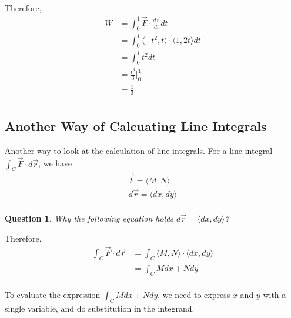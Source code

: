 \documentclass{article}
\newtheorem*{question}{Question}
\begin{document}
Therefore,
\begin{equation*}
  \begin{split}
    W &= \int_0^1 \vec{F} \cdot \frac{d\vec{r}}{dt} dt \\
      &= \int_0^1 \langle -t^2, t \rangle \cdot \langle 1, 2t \rangle dt \\
      &= \int_0^1 t^2 dt \\
      &= \frac{t^3}{3}|_0^1 \\
      &= \frac{1}{3} \\
  \end{split}
\end{equation*}

\subsection{Another Way of Calcuating Line Integrals}

Another way to look at the calculation of line integrals. For a line integral 
$\int_C \vec{F} \cdot d\vec{r}$, we have
\begin{gather*}
  \vec{F} = \langle M, N \rangle \\
  d\vec{r} = \langle dx, dy \rangle \\
\end{gather*}

\begin{question}
  Why the following equation holds $d\vec{r} = \langle dx, dy \rangle$?
\end{question}

Therefore,
\begin{equation*}
  \begin{split}
    \int_C \vec{F} \cdot d\vec{r} &= \int_C \langle M, N \rangle \cdot \langle dx, dy \rangle \\
                                  &= \int_C M dx + N dy \\
  \end{split}
\end{equation*}

To evaluate the expression $\int_C M dx + N dy$, we need to express $x$ and $y$ 
with a single variable, and do substitution in the integrand.
\end{document}

